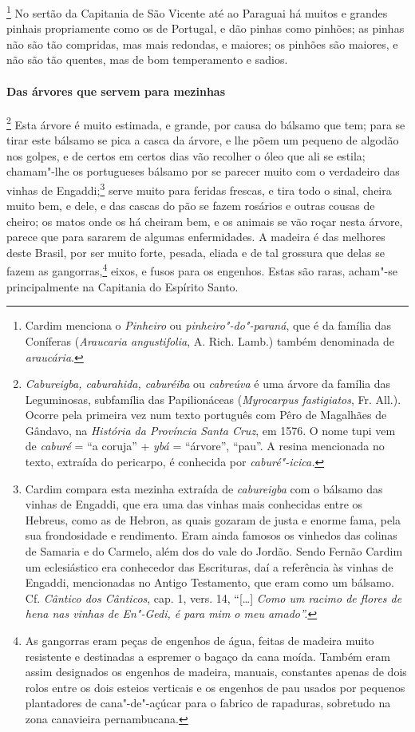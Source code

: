 \footnote{ Cardim menciona o \textit{Pinheiro} ou
\textit{pinheiro"-do"-paraná}, que é da família das Coníferas
(\textit{Araucaria angustifolia}, A. Rich. Lamb.) também denominada de
\textit{araucária}.} No sertão da Capitania de São Vicente 
até ao Paraguai há muitos e grandes pinhais propriamente como os de
Portugal, e dão pinhas como pinhões; as pinhas não são tão compridas,
mas mais redondas, e maiores; os pinhões são maiores, e não são tão
quentes, mas de bom temperamento e sadios.

\paragraph{Das árvores que servem para mezinhas}

\footnote{ \textit{Cabureigba, caburahida,
caburéiba} ou \textit{cabreúva} é uma árvore da família das
Leguminosas, subfamília das Papilionáceas (\textit{Myrocarpus
fastigiatos}, Fr. All.). Ocorre pela primeira vez num texto português
com Pêro de Magalhães de Gândavo, na \textit{História da Província Santa
Cruz}, em 1576. O nome tupi vem de \textit{caburé} = ``a
coruja'' + \textit{ybá} = ``árvore'', ``pau''. A resina mencionada no texto,
extraída do pericarpo, é conhecida por
\textit{caburé"-icica.}} Esta árvore é muito estimada, e
grande, por causa do bálsamo que tem; para se tirar este bálsamo se
pica a casca da árvore, e lhe põem um pequeno de algodão nos golpes, e
de certos em certos dias vão recolher o óleo que ali se estila;
chamam"-lhe os portugueses bálsamo por se parecer muito com o verdadeiro
das vinhas de Engaddi;\footnote{ Cardim compara esta mezinha extraída
de \textit{cabureigba} com o bálsamo das vinhas de Engaddi, que era uma
das vinhas mais conhecidas entre os Hebreus, como as de Hebron, as
quais gozaram de justa e enorme fama, pela sua frondosidade e
rendimento. Eram ainda famosos os vinhedos das colinas de Samaria e do
Carmelo, além dos do vale do Jordão. Sendo Fernão Cardim um
eclesiástico era conhecedor das Escrituras, daí a referência às vinhas
de Engaddi, mencionadas no Antigo Testamento, que eram como um bálsamo.
Cf. \textit{Cântico dos Cânticos}, cap. 1, vers. 14, ``[\ldots{}] \textit{Como um
racimo de flores de hena nas vinhas de En"-Gedi, é para mim o meu
amado''.}} serve muito para feridas frescas, e tira todo o sinal,
cheira muito bem, e dele, e das cascas do pão se fazem rosários e
outras cousas de cheiro; os matos onde os há cheiram bem, e os animais
se vão roçar nesta árvore, parece que para sararem de algumas
enfermidades. A madeira é das melhores deste Brasil, por ser muito
forte, pesada, eliada e de tal grossura que delas se fazem as 
gangorras,\footnote{ As gangorras eram peças de engenhos de água, feitas de
madeira muito resistente e destinadas a espremer o bagaço da cana
moída. Também eram assim designados os engenhos de madeira, manuais,
constantes apenas de dois rolos entre os dois esteios verticais e os
engenhos de pau usados por pequenos plantadores de cana"-de"-açúcar para
o fabrico de rapaduras, sobretudo na zona canavieira pernambucana.}
eixos, e fusos para os engenhos. Estas são raras, acham"-se
principalmente na Capitania do Espírito Santo.


